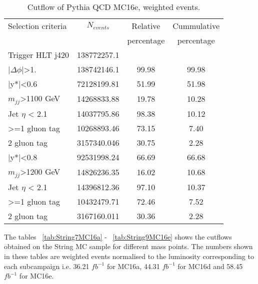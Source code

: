 \begin{table}[ht]
\begin{center}
\begin{tabular}{|l|c|c|c|}
\hline
Selection criteria & $N_{events}$ & Relative & Cummulative  \\
 & & percentage & percentage \\
\hline
Trigger HLT j420 & 138772257.1 &  &  \\
$|\Delta\phi|$>1. & 138742146.1 & 99.98 & 99.98 \\
\hline\hline
|y*|<0.6 & 72128199.81 & 51.99 & 51.98 \\
$m_{jj}$>1100 GeV & 14268833.88 & 19.78 & 10.28 \\
Jet $\eta$ < 2.1 & 14037795.86 & 98.38 & 10.12 \\
>=1 gluon tag & 10268893.46 & 73.15 & 7.40 \\
2 gluon tag & 3157340.046 & 30.75 & 2.28 \\
\hline\hline
|y*|<0.8 & 92531998.24 & 66.69 & 66.68 \\
$m_{jj}$>1200 GeV & 14826236.35 & 16.02 & 10.68 \\
Jet $\eta$ < 2.1 & 14396812.36 & 97.10 & 10.37 \\
>=1 gluon tag & 10432479.71 & 72.46 & 7.52 \\
2 gluon tag & 3167160.011 & 30.36 & 2.28 \\
\hline
\end{tabular}
\end{center}
\caption{Cutflow of Pythia QCD MC16e, weighted events.}
\label{tab:bckgdcutflowMC16eWeighted}
\end{table}

The tables ~\ref{tab:String7MC16a} -  ~\ref{tab:String9MC16e} shows the cutflows obtained on the String MC sample for different mass points. The numbers shown in these tables are weighted events normalised to the luminosity corresponding to each subcampaign i.e. 36.21 $fb^{-1}$ for MC16a, 44.31 $fb^{-1}$ for MC16d and 58.45 $fb^{-1}$ for MC16e.  

